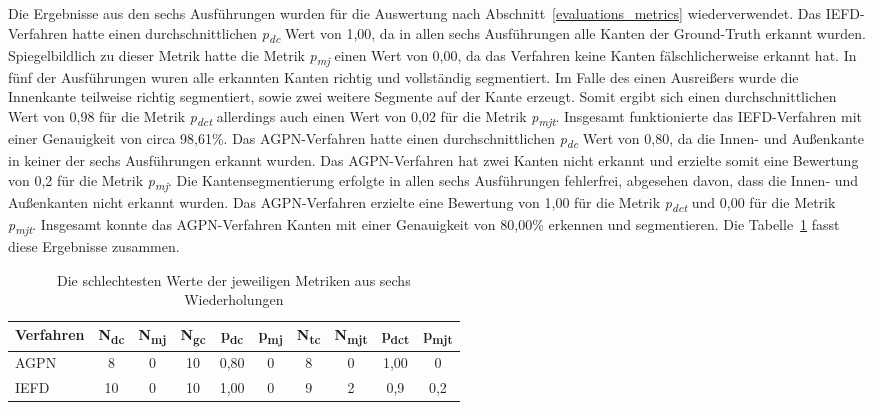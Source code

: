 Die Ergebnisse aus den sechs Ausführungen wurden für die Auswertung nach Abschnitt~\ref{evaluations_metrics} wiederverwendet. Das IEFD-Verfahren hatte einen durchschnittlichen \textit{p\textsubscript{dc}} Wert von 1,00, da in allen sechs Ausführungen alle Kanten der Ground-Truth erkannt wurden. Spiegelbildlich zu dieser Metrik hatte die Metrik \textit{p\textsubscript{mj}} einen Wert von 0,00, da das Verfahren keine Kanten fälschlicherweise erkannt hat. In fünf der Ausführungen wuren alle erkannten Kanten richtig und vollständig segmentiert. Im Falle des einen Ausreißers wurde die Innenkante teilweise richtig segmentiert, sowie zwei weitere Segmente auf der Kante erzeugt. Somit ergibt sich einen durchschnittlichen Wert von 0,98 für die Metrik \textit{p\textsubscript{dct}} allerdings auch einen Wert von 0,02 für die Metrik \textit{p\textsubscript{mjt}}. Insgesamt funktionierte das IEFD-Verfahren mit einer Genauigkeit von circa 98,61\%. Das AGPN-Verfahren hatte einen durchschnittlichen \textit{p\textsubscript{dc}} Wert von 0,80, da die Innen- und Außenkante in keiner der sechs Ausführungen erkannt wurden. Das AGPN-Verfahren hat zwei Kanten nicht erkannt und erzielte somit eine Bewertung von 0,2 für die Metrik \textit{p\textsubscript{mj}}. Die Kantensegmentierung erfolgte in allen sechs Ausführungen fehlerfrei, abgesehen davon, dass die Innen- und Außenkanten nicht erkannt wurden. Das AGPN-Verfahren erzielte eine Bewertung von 1,00 für die Metrik \textit{p\textsubscript{dct}} und 0,00 für die Metrik \textit{p\textsubscript{mjt}}. Insgesamt konnte das AGPN-Verfahren Kanten mit einer Genauigkeit von 80,00\% erkennen und segmentieren. Die Tabelle~\ref{table: metric_values} fasst diese Ergebnisse zusammen.

\begin{table}[h]
	\centering
	\begin{tabular}{l *{9}{c}}
		\hline
		\textbf{Verfahren} & \textbf{N\textsubscript{dc}} & \textbf{N\textsubscript{mj}} & \textbf{N\textsubscript{gc}} & \textbf{p\textsubscript{dc}} & \textbf{p\textsubscript{mj}} & \textbf{N\textsubscript{tc}} & \textbf{N\textsubscript{mjt}} & \textbf{p\textsubscript{dct}} & \textbf{p\textsubscript{mjt}} \\
		\hline
		AGPN & 8 & 0 & 10 & 0,80 & 0 & 8 & 0 & 1,00 & 0 \\
		IEFD & 10 & 0 & 10 & 1,00 & 0 & 9 & 2 & 0,9 & 0,2 \\
		\hline
	\end{tabular}
	\caption{Die schlechtesten Werte der jeweiligen Metriken aus sechs Wiederholungen}
	\label{table: metric_values}
\end{table}

